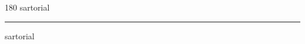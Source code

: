 
\begin{frame}
\begin{center}
\begin{turn}{180}
{\fontsize{2.5cm}{1em}\selectfont sartorial}
\end{turn}
\vspace{1em}\par  
\hrule
\vspace{1em}\par  
{\fontsize{2.5cm}{1em}\selectfont sartorial}
\end{center}
\end{frame}
